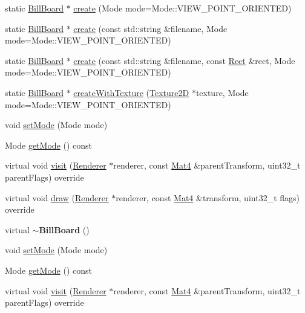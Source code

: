 \begin{DoxyCompactItemize}
\item 
static \hyperlink{classBillBoard}{Bill\+Board} $\ast$ \hyperlink{classBillBoard_aad1420ccf3a2a8ad3ec9d102124167d0}{create} (Mode mode=Mode\+::\+V\+I\+E\+W\+\_\+\+P\+O\+I\+N\+T\+\_\+\+O\+R\+I\+E\+N\+T\+ED)
\item 
static \hyperlink{classBillBoard}{Bill\+Board} $\ast$ \hyperlink{classBillBoard_af25f3d3e9241d7ea53ec4cc9568d0338}{create} (const std\+::string \&filename, Mode mode=Mode\+::\+V\+I\+E\+W\+\_\+\+P\+O\+I\+N\+T\+\_\+\+O\+R\+I\+E\+N\+T\+ED)
\item 
static \hyperlink{classBillBoard}{Bill\+Board} $\ast$ \hyperlink{classBillBoard_a802de5ef987024f2c1292ef504922058}{create} (const std\+::string \&filename, const \hyperlink{classRect}{Rect} \&rect, Mode mode=Mode\+::\+V\+I\+E\+W\+\_\+\+P\+O\+I\+N\+T\+\_\+\+O\+R\+I\+E\+N\+T\+ED)
\item 
static \hyperlink{classBillBoard}{Bill\+Board} $\ast$ \hyperlink{classBillBoard_a973b81af43b98d2d8a89f4db7ca660dd}{create\+With\+Texture} (\hyperlink{classTexture2D}{Texture2D} $\ast$texture, Mode mode=Mode\+::\+V\+I\+E\+W\+\_\+\+P\+O\+I\+N\+T\+\_\+\+O\+R\+I\+E\+N\+T\+ED)
\item 
void \hyperlink{classBillBoard_aa65a9fad6b05fd10fafaf50ad70b94d1}{set\+Mode} (Mode mode)
\item 
Mode \hyperlink{classBillBoard_a7fbd2c7bda64d7799789954d8d316b25}{get\+Mode} () const
\item 
virtual void \hyperlink{classBillBoard_a2caec4c849717693e62be305a0ca789c}{visit} (\hyperlink{classRenderer}{Renderer} $\ast$renderer, const \hyperlink{classMat4}{Mat4} \&parent\+Transform, uint32\+\_\+t parent\+Flags) override
\item 
virtual void \hyperlink{classBillBoard_ab8ccc9dc2cbbf46f1f2a56cd0283ce94}{draw} (\hyperlink{classRenderer}{Renderer} $\ast$renderer, const \hyperlink{classMat4}{Mat4} \&transform, uint32\+\_\+t flags) override
\item 
\mbox{\label{classBillBoard_ab84fd0e03cde0a0f6444cc9d601bd99f}} 
virtual {\bfseries $\sim$\+Bill\+Board} ()
\item 
void \hyperlink{classBillBoard_aa65a9fad6b05fd10fafaf50ad70b94d1}{set\+Mode} (Mode mode)
\item 
Mode \hyperlink{classBillBoard_ae95e97903db0f6748398ad93ab12975a}{get\+Mode} () const
\item 
virtual void \hyperlink{classBillBoard_ae51a82da848a1a3c70cf109cdb1b79ba}{visit} (\hyperlink{classRenderer}{Renderer} $\ast$renderer, const \hyperlink{classMat4}{Mat4} \&parent\+Transform, uint32\+\_\+t parent\+Flags) override

\end{DoxyCompactItemize}
